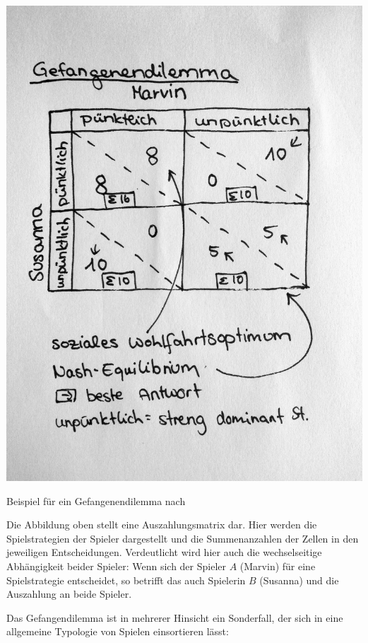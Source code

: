 \begin{dsafigure}
	\begin{center}
	\includegraphics[width=0.9\columnwidth]{img/gefangendilemma.jpg}
	\caption{Beispiel für ein Gefangenendilemma nach \cite{Kleinberg-2009-oz}}
	\label{fig:gefangenendilemma}
	\end{center}
\end{dsafigure}

Die Abbildung oben stellt eine Auszahlungsmatrix dar.
Hier werden die Spielstrategien der Spieler dargestellt und die Summenanzahlen der Zellen in den jeweiligen Entscheidungen.
Verdeutlicht wird hier auch die wechselseitige Abhängigkeit beider Spieler: Wenn sich der Spieler $A$ (Marvin) für eine Spielstrategie entscheidet, so betrifft das auch Spielerin $B$ (Susanna) und die Auszahlung an beide Spieler.

Das Gefangendilemma ist in mehrerer Hinsicht ein Sonderfall, der sich in eine allgemeine Typologie von Spielen einsortieren lässt:


